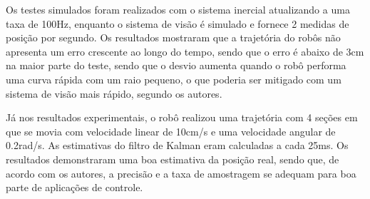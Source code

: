 \documentclass[acronym, symbols, table]{fei}
\begin{document}
	Os testes simulados foram realizados com o sistema inercial atualizando a uma taxa de 100Hz, enquanto o sistema de visão é simulado e fornece 2 medidas de posição por segundo. Os resultados mostraram que a trajetória do robôs não apresenta um erro crescente ao longo do tempo, sendo que o erro é abaixo de 3cm na maior parte do teste, sendo que o desvio aumenta quando o robô performa uma curva rápida com um raio pequeno, o que poderia ser mitigado com um sistema de visão mais rápido, segundo os autores.
	
	Já nos resultados experimentais, o robô realizou uma trajetória com 4 seções em que se movia com velocidade linear de 10cm/s e uma velocidade angular de 0.2rad/s. As estimativas do filtro de Kalman eram calculadas a cada 25ms. Os resultados demonstraram uma boa estimativa da posição real, sendo que, de acordo com os autores, a precisão e a taxa de amostragem se adequam para boa parte de aplicações de controle.
	
\end{document}
